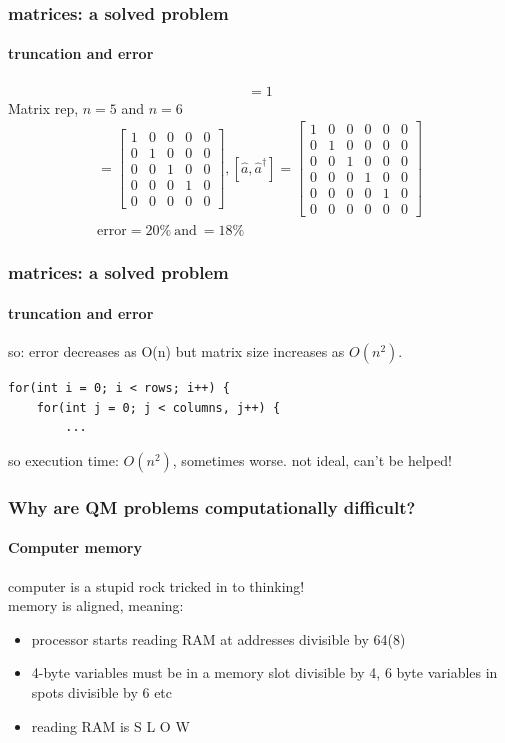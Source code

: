 \documentclass{beamer}
\begin{document}
\begin{frame}
\frametitle{matrices: a solved problem}
\framesubtitle{truncation and error}
\begin{align}
[\hat{a}, \hat{a}^\dagger] = 1
\end{align}
Matrix rep, $n = 5$ and $n = 6$
\begin{align*}
[\hat{a}, \hat{a}^\dagger] = \begin{bmatrix}
1 & 0 & 0 & 0 & 0 \\
0 & 1 & 0 & 0 & 0 \\
0 & 0 & 1 & 0 & 0 \\
0 & 0 & 0 & 1 & 0 \\
0 & 0 & 0 & 0 & 0
\end{bmatrix}, [\hat{a}, \hat{a}^\dagger] = \begin{bmatrix}
1 & 0 & 0 & 0 & 0 & 0\\
0 & 1 & 0 & 0 & 0 & 0\\
0 & 0 & 1 & 0 & 0 & 0\\
0 & 0 & 0 & 1 & 0 & 0\\
0 & 0 & 0 & 0 & 1 & 0\\
0 & 0 & 0 & 0 & 0 & 0
\end{bmatrix}\\
\mathrm{error} = 20\% \ \mathrm{and}\ =18\%
\end{align*}
\end{frame}
\begin{frame}[fragile]
\frametitle{matrices: a solved problem}
\framesubtitle{truncation and error}
so: error decreases as O(n) but matrix size increases as $O(n^2)$.\\

\begin{lstlisting}
for(int i = 0; i < rows; i++) {
	for(int j = 0; j < columns, j++) {
		...
\end{lstlisting}
so execution time: $O(n^2)$, sometimes worse. not ideal, can't be helped!
\end{frame}
\begin{frame}
\frametitle{Why are QM problems computationally difficult?}
\framesubtitle{Computer memory}
computer is a stupid rock tricked in to thinking!\\
memory is aligned, meaning:
\begin{itemize}
\item processor starts reading RAM at addresses divisible by 64(8)
\item 4-byte variables must be in a memory slot divisible by 4, 6 byte variables in spots divisible by 6 etc
\item reading RAM is S L O W
\end{itemize}
\end{frame}
\end{document}
